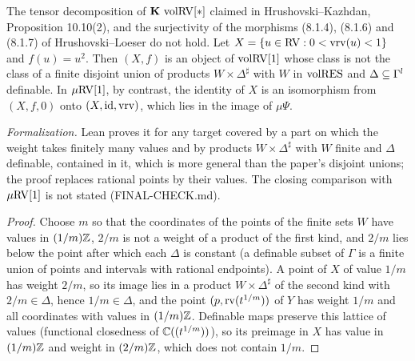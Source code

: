 \setcounter{theorem}{6}
\begin{remark}
\label{rem-HK-fail}
\leanok
{}
The tensor decomposition of $\operatorname{\mathbf{K}}\,\mathrm{vol}\mathrm{RV}[*]$ claimed in Hrushovski--Kazhdan, Proposition 10.10(2), and the surjectivity of the morphisms (8.1.4), (8.1.6) and (8.1.7) of Hrushovski--Loeser do not hold. Let $X = \{u \in \mathrm{RV} : 0 < \operatorname{vrv}(u) < 1\}$ and $f(u) = u^2$. Then $(X, f)$ is an object of $\mathrm{vol}\mathrm{RV}[1]$ whose class is not the class of a finite disjoint union of products $W \times \Delta^\sharp$ with $W$ in $\mathrm{vol}\mathrm{RES}$ and $\Delta \subseteq \Gamma^l$ definable. In $\mu\mathrm{RV}[1]$, by contrast, the identity of $X$ is an isomorphism from $(X, f, 0)$ onto $(X, \mathrm{id}, \operatorname{vrv})$, which lies in the image of $\mu\Psi$.

\emph{Formalization.} Lean proves it for any target covered by a part on which the weight takes finitely many values and by products $W \times \Delta^\sharp$ with $W$ finite and $\Delta$ definable, contained in it, which is more general than the paper's disjoint unions; the proof replaces rational points by their values. The closing comparison with $\mu\mathrm{RV}[1]$ is not stated (FINAL-CHECK.md).
\end{remark}

\begin{proof}
\leanok
Choose $m$ so that the coordinates of the points of the finite sets $W$ have values in $(1/m)\mathbb{Z}$, $2/m$ is not a weight of a product of the first kind, and $2/m$ lies below the point after which each $\Delta$ is constant (a definable subset of $\Gamma$ is a finite union of points and intervals with rational endpoints). A point of $X$ of value $1/m$ has weight $2/m$, so its image lies in a product $W \times \Delta^\sharp$ of the second kind with $2/m \in \Delta$, hence $1/m \in \Delta$, and the point $(p, \operatorname{rv}(t^{1/m}))$ of $Y$ has weight $1/m$ and all coordinates with values in $(1/m)\mathbb{Z}$. Definable maps preserve this lattice of values (functional closedness of $\mathbb{C}((t^{1/m}))$), so its preimage in $X$ has value in $(1/m)\mathbb{Z}$ and weight in $(2/m)\mathbb{Z}$, which does not contain $1/m$.
\end{proof}

